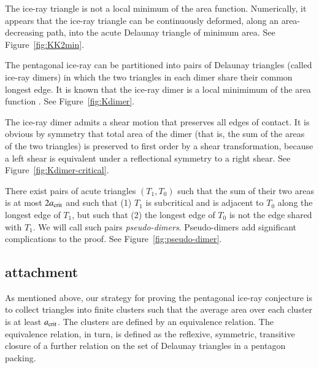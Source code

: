 
\begin{example}  
  The ice-ray triangle is not a local minimum of the area function.
  Numerically, it appears that the ice-ray triangle can be
  continuously deformed, along an area-decreasing path, into the acute
  Delaunay triangle of minimum area. See Figure~\ref{fig:KK2min}.
\end{example}


\begin{example}  
  The pentagonal ice-ray can be partitioned into pairs of Delaunay
  triangles (called ice-ray dimers) in which the two triangles in each
  dimer share their common longest edge.  It is known that the ice-ray
  dimer is a local minimimum of the area function \cite{Kus}. See
  Figure~\ref{fig:Kdimer}.
\end{example}


\begin{example} 
  The ice-ray dimer admits a shear motion that preserves all edges of
  contact.  It is obvious by symmetry that total area of the dimer
  (that is, the sum of the areas of the two triangles) is preserved to
  first order by a shear transformation, because a left shear is
  equivalent under a reflectional symmetry to a right shear.  See
  Figure~\ref{fig:Kdimer-critical}.
\end{example}


\begin{example} 
  There exist pairs of acute triangles $(T_1,T_0)$ such that the sum
  of their two areas is at most $2a_\text{crit}$ and such that (1) $T_1$ is
  subcritical and is adjacent to $T_0$ along the longest edge of
  $T_1$, but such that (2) the longest edge of $T_0$ is not the edge
  shared with $T_1$.  We will call such pairs {\it pseudo-dimers}.
  Pseudo-dimers add significant complications to the proof.  See
  Figure~\ref{fig:pseudo-dimer}.
\end{example}


\subsection{attachment}

As mentioned above, our strategy for proving the pentagonal ice-ray
conjecture is to collect triangles into finite clusters such that the
average area over each cluster is at least $a_\text{crit}$.  The clusters are
defined by an equivalence relation.  The equivalence relation, in
turn, is defined as the reflexive, symmetric, transitive closure of a
further relation on the set of Delaunay triangles in a pentagon
packing.

